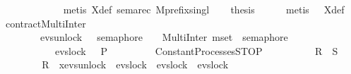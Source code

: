 \begin{isabellebody}
\ \ \ \ \ \ \ \ \ \ \ \isamarkupfalse%
\ {\isacharparenleft}{\kern0pt}metis\ X{\isacharunderscore}{\kern0pt}def\ sema{\isacharunderscore}{\kern0pt}rec\ Mprefix{\isacharunderscore}{\kern0pt}singl{\isacharparenright}{\kern0pt}\isanewline
\ \ \isamarkupfalse%
\ {\isacharquery}{\kern0pt}thesis\isanewline
\ \ \ \ \isamarkupfalse%
\ {\isacharparenleft}{\kern0pt}metis\ {\isacharasterisk}{\kern0pt}\ {\isacharasterisk}{\kern0pt}{\isacharasterisk}{\kern0pt}\ X{\isacharunderscore}{\kern0pt}def{\isacharparenright}{\kern0pt}\isanewline
{}\isamarkupfalse%
%
\endisatagproof
{\isafoldproof}%
%
\isadelimproof
\isanewline
%
\endisadelimproof
\isanewline
\isanewline
{}\isamarkupfalse%
\ contractMultiInter{}{\isacharcolon}{\kern0pt}\ \isanewline
\ \ \ \ \ \ {\isachardoublequoteopen}\ \ {\isacharparenleft}{\kern0pt}{\isacharparenleft}{\kern0pt}evs{\isachardot}{\kern0pt}unlock\ {}\ {\isasymrightarrow}\ semaphore\ {}\ \ {\isacharbar}{\kern0pt}{\isacharbar}{\kern0pt}{\isacharbar}{\kern0pt}\ MultiInter\ {\isacharparenleft}{\kern0pt}mset\ {\isacharbrackleft}{\kern0pt}{}{\isachardot}{\kern0pt}{\isachardot}{\kern0pt}{}{\isacharbrackright}{\kern0pt}{\isacharparenright}{\kern0pt}\ semaphore{\isacharparenright}{\kern0pt}\ \isanewline
\ \ \ \ \ \ \ \ \ {\isacharbar}{\kern0pt}{\isacharbar}{\kern0pt}\ \ evs{\isachardot}{\kern0pt}lock\ {}\ {\isasymrightarrow}\ P{\isacharparenright}{\kern0pt}\ \isanewline
\ \ \ \ \ \ \ {\isacharequal}{\kern0pt}\ Constant{\isacharunderscore}{\kern0pt}Processes{\isachardot}{\kern0pt}STOP{\isachardoublequoteclose}\isanewline
\ \ \ \ \ \ \ \ \ {\isacharparenleft}{\kern0pt}\ {\isachardoublequoteopen}{\isacharparenleft}{\kern0pt}{\isacharquery}{\kern0pt}R\ {\isacharbar}{\kern0pt}{\isacharbar}{\kern0pt}\ {\isacharquery}{\kern0pt}S{\isacharparenright}{\kern0pt}\ {\isacharequal}{\kern0pt}\ {\isacharunderscore}{\kern0pt}{\isachardoublequoteclose}{\isacharparenright}{\kern0pt}\isanewline
%
\isadelimproof
%
\endisadelimproof
%
\isatagproof
{}\isamarkupfalse%
\ {\isacharminus}{\kern0pt}\ \isanewline
\ \ \isamarkupfalse%
\ {}\ {\isacharcolon}{\kern0pt}\ {\isachardoublequoteopen}{\isacharquery}{\kern0pt}R\ {\isacharequal}{\kern0pt}\ {\isasymbox}x{\isasymin}{\isacharbraceleft}{\kern0pt}evs{\isachardot}{\kern0pt}unlock\ {}{\isacharcomma}{\kern0pt}\ evs{\isachardot}{\kern0pt}lock\ {}{\isacharcomma}{\kern0pt}\ evs{\isachardot}{\kern0pt}lock\ {}{\isacharcomma}{\kern0pt}\ evs{\isachardot}{\kern0pt}lock\ {}{\isacharbraceright}{\kern0pt}\isanewline

\end{isabellebody}
